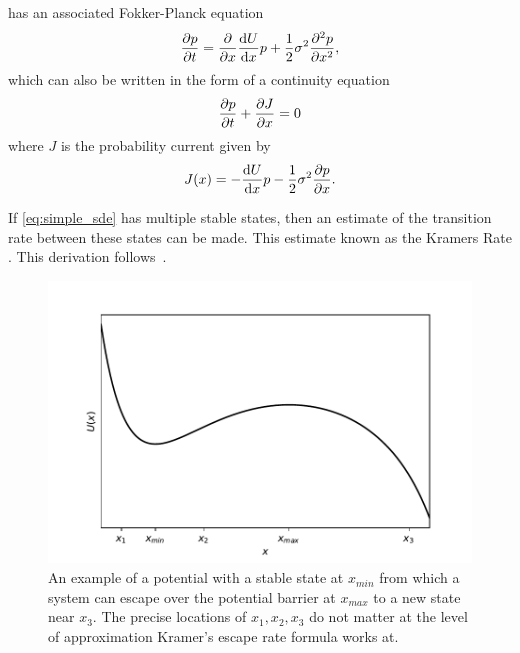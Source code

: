  has an associated Fokker-Planck equation
\begin{equation}
  \label{eq:fokker_planck_one_d}
  \pdv{p}{t} = \pdv{x} \dv{U}{x}p + \frac{1}{2}\sigma^2 \pdv[2]{p}{x},
\end{equation}
which can also be written in the form of a continuity equation
\begin{equation}
  \label{eq:fokker_planck_continuity}
  \pdv{p}{t} + \pdv{J}{x} = 0
\end{equation}
where $J$ is the probability current given by
\begin{equation}
  \label{eq:probability_current}
  J(x) = -\dv{U}{x}p - \frac{1}{2}\sigma^2 \pdv{p}{x}.
\end{equation}

If \cref{eq:simple_sde} has multiple stable states, then an estimate of the transition rate between these states can be made. This estimate known
as the Kramers Rate \parencite{Kramers1940}. This derivation follows~\cite{Risken1984}.

\begin{figure}
  \centering
  \includegraphics[width=\textwidth,keepaspectratio]{potential_to_escape}
  \caption{An example of a potential with a stable state at $x_{min}$ from which a system can escape over the potential barrier at $x_{max}$ to a new state near $x_3$.
  The precise locations of $x_1,x_2,x_3$ do not matter at the level of approximation Kramer's escape rate formula works at.}
  \label{fig:potential_to_escape}
\end{figure}

